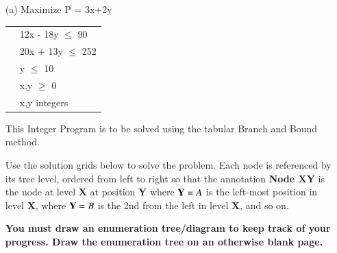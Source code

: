 \documentclass[12pt]{article}
\begin{document}
				\begin{itemize}
					\item[(a)] 
					Maximize P = 3x+2y
			
					\begin{tabular}{cl}
						
						\phantom{space}
						\phantom{space} & 12x - 18y $\leq$ 90\\
						& 20x + 13y $\leq$ 252\\
						& y $\leq$ 10\\
			
						& x,y $\geq$ 0\\
						& x,y integers\\
						
					\end{tabular} 
					
					\smallskip
					This Integer Program is to be solved using the tabular Branch and Bound method.
					
	\medskip
					Use the solution grids below to solve the problem. Each node is referenced by its tree level, ordered from left to right so that the annotation {\bf Node XY} is the node at level {\bf X} at position {\bf Y} where ${\bf Y}=A$ is the left-most position in level {\bf X}, where ${\bf Y}=B$ is the 2nd from the left in level {\bf X}, and so on. 
					
					{\bf You must draw an enumeration tree/diagram to keep track of your progress. Draw the enumeration tree on an otherwise blank page.}
					
					
					
					
					
					
				\end{itemize}
				
\end{document}
